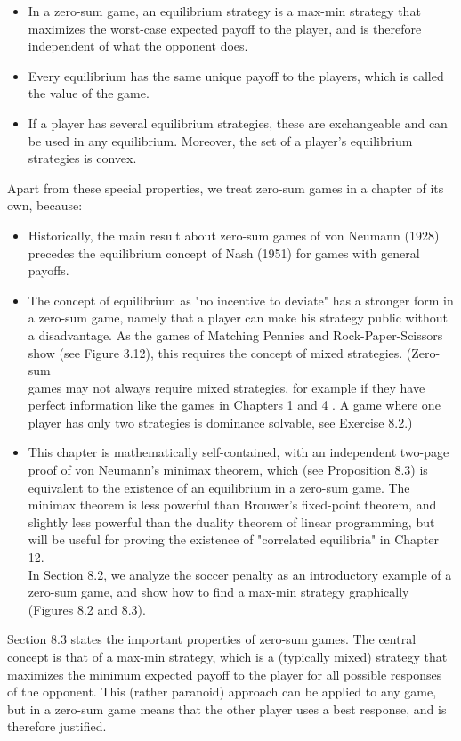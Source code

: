 \documentclass[12pt]{article}
\begin{document}
\begin{itemize}
  \item In a zero-sum game, an equilibrium strategy is a max-min strategy that maximizes the worst-case expected payoff to the player, and is therefore independent of what the opponent does.
  \item Every equilibrium has the same unique payoff to the players, which is called the value of the game.
  \item If a player has several equilibrium strategies, these are exchangeable and can be used in any equilibrium. Moreover, the set of a player's equilibrium strategies is convex.
\end{itemize}

Apart from these special properties, we treat zero-sum games in a chapter of its own, because:

\begin{itemize}
  \item Historically, the main result about zero-sum games of von Neumann (1928) precedes the equilibrium concept of Nash (1951) for games with general payoffs.
  \item The concept of equilibrium as "no incentive to deviate" has a stronger form in a zero-sum game, namely that a player can make his strategy public without a disadvantage. As the games of Matching Pennies and Rock-Paper-Scissors show (see Figure 3.12), this requires the concept of mixed strategies. (Zero-sum\\
games may not always require mixed strategies, for example if they have perfect information like the games in Chapters 1 and 4 . A game where one player has only two strategies is dominance solvable, see Exercise 8.2.)
  \item This chapter is mathematically self-contained, with an independent two-page proof of von Neumann's minimax theorem, which (see Proposition 8.3) is equivalent to the existence of an equilibrium in a zero-sum game. The minimax theorem is less powerful than Brouwer's fixed-point theorem, and slightly less powerful than the duality theorem of linear programming, but will be useful for proving the existence of "correlated equilibria" in Chapter 12.\\
In Section 8.2, we analyze the soccer penalty as an introductory example of a zero-sum game, and show how to find a max-min strategy graphically (Figures 8.2 and 8.3).
\end{itemize}

Section 8.3 states the important properties of zero-sum games. The central concept is that of a max-min strategy, which is a (typically mixed) strategy that maximizes the minimum expected payoff to the player for all possible responses of the opponent. This (rather paranoid) approach can be applied to any game, but in a zero-sum game means that the other player uses a best response, and is therefore justified.
\end{document}
